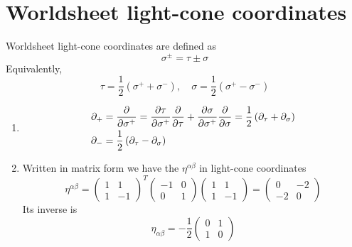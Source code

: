 \section{Worldsheet light-cone coordinates}
Worldsheet light-cone coordinates are defined as
\begin{equation}
	\sigma^{\pm} = \tau \pm \sigma
\end{equation}
Equivalently,
\begin{equation}
	\tau = \frac{1}{2} \left( \sigma^+ + \sigma^- \right) ,\quad \sigma = \frac{1}{2 } \left( \sigma^+ - \sigma^- \right)
\end{equation}
\begin{enumerate}[label=(\alph*)]
	\item
		\begin{align}
			\partial_+ &= \pdv{\sigma^+} = \pdv{\tau}{\sigma^+} \pdv{\tau} +  \pdv{\sigma}{\sigma^+} \pdv{\sigma} = \frac{1}{2} \left( \partial_\tau + \partial_\sigma \right) \\
			\partial_- &= \frac{1}{2} \left( \partial_\tau - \partial_\sigma \right)
		\end{align}
	\item Written in matrix form we have the $\eta^{\alpha\beta}$ in light-cone coordinates
		\begin{equation*}
			\eta^{\alpha\beta} = \begin{pmatrix} 1 & 1 \\ 1 & -1 \end{pmatrix}^{T} \begin{pmatrix} -1 & 0 \\ 0 & 1 \end{pmatrix} \begin{pmatrix} 1 & 1 \\ 1 & -1\end{pmatrix} = \begin{pmatrix} 0 & -2 \\ -2 & 0 \end{pmatrix}
		\end{equation*}
		Its inverse is
		\begin{equation}
			\eta_{\alpha\beta} = - \frac{1}{2} \begin{pmatrix} 0 & 1 \\ 1 & 0 \end{pmatrix}
		\end{equation}


\end{enumerate}
